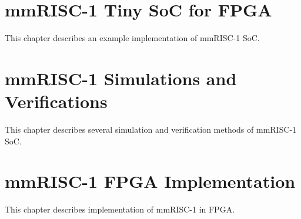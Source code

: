 \documentclass[a4paper,12pt]{book}
\begin{document}
\newpage\chapter{mmRISC-1 Tiny SoC for FPGA}
This chapter describes an example implementation of mmRISC-1 SoC.

\newpage\chapter{mmRISC-1 Simulations and Verifications}
This chapter describes several simulation and verification methods of mmRISC-1 SoC.


\newpage\chapter{mmRISC-1 FPGA Implementation}
This chapter describes implementation of mmRISC-1 in FPGA.
\end{document}
